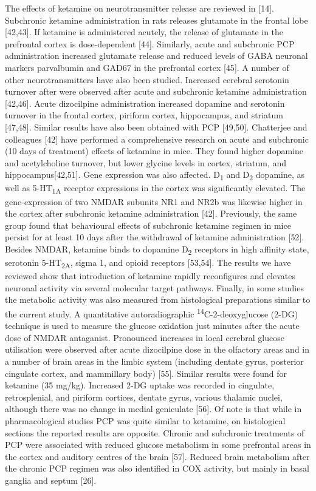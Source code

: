 \documentclass[man]{apa6}
\begin{document}
The effects of ketamine on neurotransmitter release are reviewed in {[}14{]}. Subchronic ketamine administration in rats releases glutamate in the frontal lobe {[}42,43{]}. If ketamine is administered acutely, the release of glutamate in the prefrontal cortex is dose-dependent {[}44{]}. Similarly, acute and subchronic PCP administration increased glutamate release and reduced levels of GABA neuronal markers parvalbumin and GAD67 in the prefrontal cortex {[}45{]}. A number of other neurotransmitters have also been studied. Increased cerebral serotonin turnover after were observed after acute and subchronic ketamine administration {[}42,46{]}. Acute dizocilpine administration increased dopamine and serotonin turnover in the frontal cortex, piriform cortex, hippocampus, and striatum {[}47,48{]}. Similar results have also been obtained with PCP {[}49,50{]}.
Chatterjee and colleagues {[}42{]} have performed a comprehensive research on acute and subchronic (10 days of treatment) effects of ketamine in mice. They found higher dopamine and acetylcholine turnover, but lower glycine levels in cortex, striatum, and hippocampus{[}42,51{]}. Gene expression was also affected. D\textsubscript{1} and D\textsubscript{2} dopamine, as well as 5-HT\textsubscript{1A} receptor expressions in the cortex was significantly elevated. The gene-expression of two NMDAR subunits NR1 and NR2b was likewise higher in the cortex after subchronic ketamine administration {[}42{]}. Previously, the same group found that behavioural effects of subchronic ketamine regimen in mice persist for at least 10 days after the withdrawal of ketamine administration {[}52{]}. Besides NMDAR, ketamine binds to dopamine D\textsubscript{2} receptors in high affinity state, serotonin 5-HT\textsubscript{2A}, sigma 1, and opioid receptors {[}53,54{]}. The results we have reviewed show that introduction of ketamine rapidly reconfigures and elevates neuronal activity via several molecular target pathways. Finally, in some studies the metabolic activity was also measured from histological preparations similar to the current study. A quantitative autoradiographic \textsuperscript{14}C-2-deoxyglucose (2-DG) technique is used to measure the glucose oxidation just minutes after the acute dose of NMDAR antaganist. Pronounced increases in local cerebral
glucose utilisation were observed after acute dizocilpine dose in the olfactory areas and in a number of brain areas in the limbic system (including dentate gyrus, posterior cingulate cortex, and mammillary body) {[}55{]}. Similar results were found for ketamine (35 mg/kg). Increased 2-DG uptake was recorded in cingulate, retrosplenial, and piriform cortices, dentate gyrus, various thalamic nuclei, although there was no change in medial geniculate {[}56{]}. Of note is that while in pharmacological studies PCP was quite similar to ketamine, on histological sections the reported results are opposite. Chronic and subchronic treatments of PCP were associated with reduced glucose metabolism in some prefrontal areas in the cortex and auditory centres of the brain {[}57{]}. Reduced brain metabolism after the chronic PCP regimen was also identified in COX activity, but mainly in basal ganglia and septum {[}26{]}.
\end{document}
